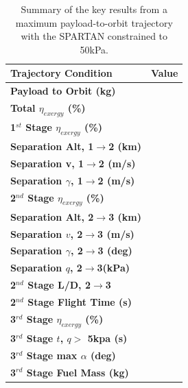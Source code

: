 \begin{table}[ht]
	\centering
	
	\begin{tabular}{l c } 
		\hline \textbf{Trajectory Condition}
		& Value

		\\
		\hline \textbf{Payload to Orbit (kg)}
		& \textbf{\PayloadToOrbitConstq}
		\\
		\textbf{Total $\eta_{exergy}$ (\%)}
		& \textbf{\totalExergyEffConstq}
		\\
		\hline 
		\textbf{1$^{st}$ Stage $\eta_{exergy}$ (\%)}
		& \textbf{\firstExergyEffConstq}
		\\
		\textbf{Separation Alt, 1$\rightarrow$2 (km)}
		& \firstsecondSeparationAltConstq
		\\
		\textbf{Separation v, 1$\rightarrow$2 (m/s)}
		& \firstsecondSeparationvConstq
		\\
		\textbf{Separation $\gamma$, 1$\rightarrow$2 (m/s)}
		& \firstsecondSeparationgammaConstq
		\\
		\hline 
		\textbf{2$^{nd}$ Stage $\eta_{exergy}$ (\%)}
		& \textbf{\secondExergyEffConstq}
		\\
		\textbf{Separation Alt, 2$\rightarrow$3 (km)}
		& \secondthirdSeparationAltConstq
		\\
		\textbf{Separation $v$, 2$\rightarrow$3 (m/s)}
		& \secondthirdSeparationvConstq
		\\
		\textbf{Separation $\gamma$, 2$\rightarrow$3 (deg)}
		& \secondthirdSeparationgammaConstq
		\\
		\textbf{Separation $q$, 2$\rightarrow$3(kPa)}
		& \secondthirdSeparationqConstq
		\\
		\textbf{2$^{nd}$ Stage L/D, 2$\rightarrow$3}
		& \secondthirdSeparationLDConstq
		\\
		\textbf{2$^{nd}$ Stage Flight Time (s)}
		& \secondFlightTimeConstq
		\\
		\hline 
		\textbf{3$^{rd}$ Stage $\eta_{exergy}$ (\%)}
		& \textbf{\thirddExergyEffConstq}
		\\
		\textbf{3$^{rd}$ Stage $t$, $q >$ 5kpa (s)}
		& \thirdqOverFiveConstq
		\\
		\textbf{3$^{rd}$ Stage max $\alpha$ (deg)}
		& \thirdmaxAoAConstq
		\\
		\textbf{3$^{rd}$ Stage Fuel Mass (kg)}
		& \thirdmFuelConstq
		\\
		\hline 
	\end{tabular} 
	
	\caption{Summary of the key results from a maximum payload-to-orbit trajectory with the SPARTAN constrained to 50kPa.}
	\label{tab:constqsummary}
\end{table}
